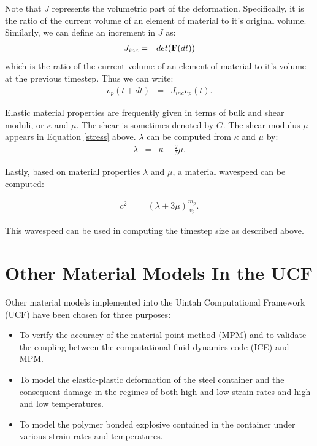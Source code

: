 \documentclass[10pt]{article}
\newcommand{\tn}[1]{\mbox{\bf{#1}}}
\begin{document}
Note that $J$ represents the volumetric part of the deformation.  
Specifically, it is the ratio of the current volume of an 
element of material to it's original volume.  Similarly, we can
define an increment in $J$ as:
\begin{eqnarray}
	J_{inc} &=& det(\tn{F}(dt))
\end{eqnarray}
which  is the ratio of the current volume of an element of 
material to it's volume at the previous timestep.  Thus we can 
write:
\begin{eqnarray}
	v_p(t+dt) &=& J_{inc} v_p(t).
\end{eqnarray}

Elastic material properties are frequently given in terms of 
bulk and shear moduli, or $\kappa$ and $\mu$.  The shear is 
sometimes denoted by $G$.  The shear modulus $\mu$ appears in 
Equation \ref{stress} above.  $\lambda$ can be computed from
$\kappa$ and $\mu$ by:
\begin{eqnarray}
	\lambda &=& \kappa - \frac{2}{3}\mu.
\end{eqnarray}

Lastly, based on material properties $\lambda$ and $\mu$, a material 
wavespeed can be computed:

\begin{eqnarray}
	c^2 &=& (\lambda + 3 \mu)\frac{m_p}{v_p}.
\end{eqnarray}

This wavespeed can be used in computing the timestep size as 
described above.

\section{Other Material Models In the UCF}
Other material models implemented into the Uintah Computational
Framework (UCF) have been chosen for three purposes:
\begin{itemize}
  \item To verify the accuracy of the material point method (MPM)
        and to validate the coupling between the computational fluid 
        dynamics code (ICE) and MPM.
  \item To model the elastic-plastic deformation of the steel
        container and the consequent damage in the regimes of 
        both high and low strain rates and high and low temperatures.
  \item To model the polymer bonded explosive contained in the 
        container under various strain rates and temperatures.
\end{itemize}
\end{document}
